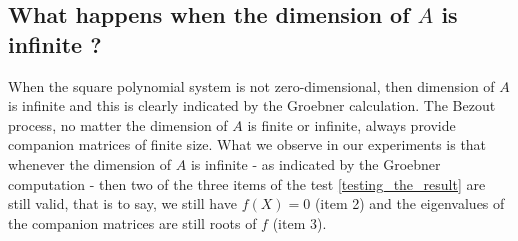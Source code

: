 \documentclass{standalone}
\begin{document}
\subsection{What happens when the dimension of $A$ is infinite ?}
When the square polynomial system is not zero-dimensional, then dimension of $A$ is infinite and this is clearly indicated by the Groebner calculation. The Bezout process, no matter the dimension of $A$ is finite or infinite, always provide companion matrices of finite size.
What we observe in our experiments is that whenever the dimension of $A$ is infinite - as indicated by the Groebner computation - then two of the three items of the test \ref{testing_the_result} are still valid, that is to say, we still have $f(X) = 0$ (item 2) and the eigenvalues of the companion matrices are still roots of $f$ (item 3).
\end{document}
